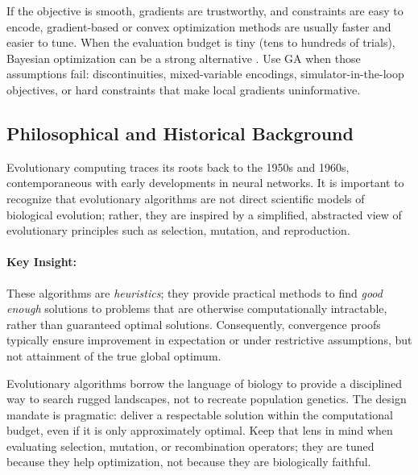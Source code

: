 \begin{tcolorbox}[summarybox, title={When GA is not the first choice}]
If the objective is smooth, gradients are trustworthy, and constraints are easy to encode, gradient-based or convex optimization methods are usually faster and easier to tune. When the evaluation budget is tiny (tens to hundreds of trials), Bayesian optimization can be a strong alternative \citep{Frazier2018}. Use GA when those assumptions fail: discontinuities, mixed-variable encodings, simulator-in-the-loop objectives, or hard constraints that make local gradients uninformative.
\end{tcolorbox}

\subsection{Philosophical and Historical Background}
\label{sec:evo_philosophical_and_historical_background}

Evolutionary computing traces its roots back to the 1950s and 1960s, contemporaneous with early developments in neural networks. It is important to recognize that evolutionary algorithms are not direct scientific models of biological evolution; rather, they are inspired by a simplified, abstracted view of evolutionary principles such as selection, mutation, and reproduction.

\paragraph{Key Insight:} These algorithms are \emph{heuristics}; they provide practical methods to find \emph{good enough} solutions to problems that are otherwise computationally intractable, rather than guaranteed optimal solutions. Consequently, convergence proofs typically ensure improvement in expectation or under restrictive assumptions, but not attainment of the true global optimum.

\begin{tcolorbox}[summarybox, title={Author's note: a pragmatic take on evolution}]
Evolutionary algorithms borrow the language of biology to provide a disciplined way to search rugged landscapes, not to recreate population genetics. The design mandate is pragmatic: deliver a respectable solution within the computational budget, even if it is only approximately optimal. Keep that lens in mind when evaluating selection, mutation, or recombination operators; they are tuned because they help optimization, not because they are biologically faithful.
\end{tcolorbox}

